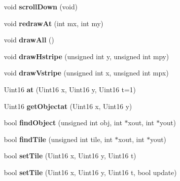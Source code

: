 \begin{DoxyCompactItemize}
\item 
\hypertarget{class_c_map_a2077b6931da29f4123b5fd1877868eee}{
void {\bfseries scrollDown} (void)}
\label{class_c_map_a2077b6931da29f4123b5fd1877868eee}

\item 
\hypertarget{class_c_map_a42ff54e6e128200c6fe2908c4d519a6d}{
void {\bfseries redrawAt} (int mx, int my)}
\label{class_c_map_a42ff54e6e128200c6fe2908c4d519a6d}

\item 
\hypertarget{class_c_map_a2bc34efd10d8f848e8e12712b90c3481}{
void {\bfseries drawAll} ()}
\label{class_c_map_a2bc34efd10d8f848e8e12712b90c3481}

\item 
\hypertarget{class_c_map_aa02b9ffcb28336055e41d8623b2e1e07}{
void {\bfseries drawHstripe} (unsigned int y, unsigned int mpy)}
\label{class_c_map_aa02b9ffcb28336055e41d8623b2e1e07}

\item 
\hypertarget{class_c_map_a15d78c23a982209173757a21746321fa}{
void {\bfseries drawVstripe} (unsigned int x, unsigned int mpx)}
\label{class_c_map_a15d78c23a982209173757a21746321fa}

\item 
\hypertarget{class_c_map_a68f6d23097878684a981d34e0a193026}{
Uint16 {\bfseries at} (Uint16 x, Uint16 y, Uint16 t=1)}
\label{class_c_map_a68f6d23097878684a981d34e0a193026}

\item 
\hypertarget{class_c_map_a0e82bb53c0e60f3d020a691ed7af8d4d}{
Uint16 {\bfseries getObjectat} (Uint16 x, Uint16 y)}
\label{class_c_map_a0e82bb53c0e60f3d020a691ed7af8d4d}

\item 
\hypertarget{class_c_map_abbddc71617625acec0c60e5d907589fb}{
bool {\bfseries findObject} (unsigned int obj, int $\ast$xout, int $\ast$yout)}
\label{class_c_map_abbddc71617625acec0c60e5d907589fb}

\item 
\hypertarget{class_c_map_a35a18bcb5cddb51ef44a71dfb8e13992}{
bool {\bfseries findTile} (unsigned int tile, int $\ast$xout, int $\ast$yout)}
\label{class_c_map_a35a18bcb5cddb51ef44a71dfb8e13992}

\item 
\hypertarget{class_c_map_ae1bfe189abd33a04106862cda6fde819}{
bool {\bfseries setTile} (Uint16 x, Uint16 y, Uint16 t)}
\label{class_c_map_ae1bfe189abd33a04106862cda6fde819}

\item 
\hypertarget{class_c_map_aa8266737568a4d4fd04baf34aff8fcf6}{
bool {\bfseries setTile} (Uint16 x, Uint16 y, Uint16 t, bool update)}
\label{class_c_map_aa8266737568a4d4fd04baf34aff8fcf6}


\end{DoxyCompactItemize}
